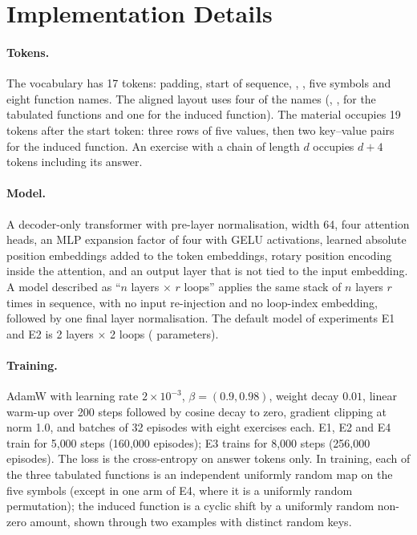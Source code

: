 \section{Implementation Details}
\label{app:details}

\paragraph{Tokens.}
The vocabulary has 17 tokens: padding, start of sequence, , \tok{=}, five symbols and eight function names.
The aligned layout uses four of the names (, ,  for the tabulated functions and one for the induced function).
The material occupies 19 tokens after the start token: three rows of five values, then two key--value pairs for the induced function.
An exercise with a chain of length $d$ occupies $d+4$ tokens including its answer.

\paragraph{Model.}
A decoder-only transformer with pre-layer normalisation, width 64, four attention heads, an MLP expansion factor of four with GELU activations, learned absolute position embeddings added to the token embeddings, rotary position encoding inside the attention, and an output layer that is not tied to the input embedding.
A model described as ``$n$ layers $\times$ $r$ loops'' applies the same stack of $n$ layers $r$ times in sequence, with no input re-injection and no loop-index embedding, followed by one final layer normalisation.
The default model of experiments E1 and E2 is 2 layers $\times$ 2 loops (\NparamsMain{} parameters).

\paragraph{Training.}
AdamW with learning rate $2\times10^{-3}$, $\beta = (0.9, 0.98)$, weight decay $0.01$, linear warm-up over 200 steps followed by cosine decay to zero, gradient clipping at norm 1.0, and batches of 32 episodes with eight exercises each.
E1, E2 and E4 train for 5{,}000 steps (160{,}000 episodes); E3 trains for 8{,}000 steps (256{,}000 episodes).
The loss is the cross-entropy on answer tokens only.
In training, each of the three tabulated functions is an independent uniformly random map on the five symbols (except in one arm of E4, where it is a uniformly random permutation); the induced function is a cyclic shift by a uniformly random non-zero amount, shown through two examples with distinct random keys.

